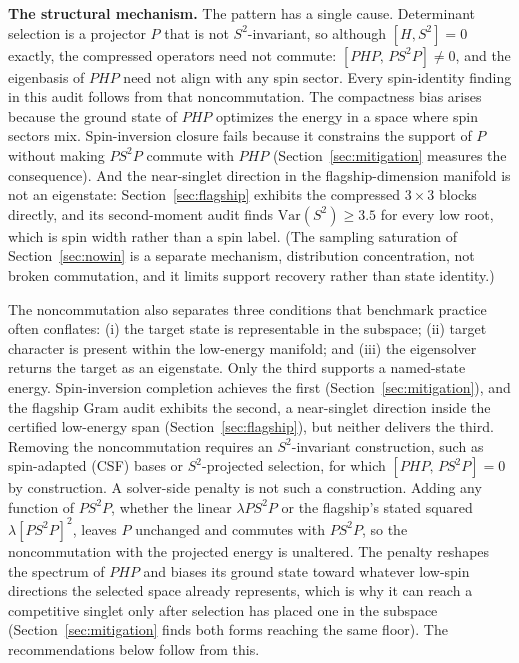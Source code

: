 \documentclass[11pt]{article}
\begin{document}
\textbf{The structural mechanism.} The pattern has a single cause. Determinant selection is a projector $P$ that is not $S^2$-invariant, so although $[H, S^2] = 0$ exactly, the compressed operators need not commute: $[PHP,\, PS^2P] \neq 0$, and the eigenbasis of $PHP$ need not align with any spin sector. Every spin-identity finding in this audit follows from that noncommutation. The compactness bias arises because the ground state of $PHP$ optimizes the energy in a space where spin sectors mix. Spin-inversion closure fails because it constrains the support of $P$ without making $PS^2P$ commute with $PHP$ (Section~\ref{sec:mitigation} measures the consequence). And the near-singlet direction in the flagship-dimension manifold is not an eigenstate: Section~\ref{sec:flagship} exhibits the compressed $3\times3$ blocks directly, and its second-moment audit finds $\mathrm{Var}(S^2) \ge 3.5$ for every low root, which is spin width rather than a spin label. (The sampling saturation of Section~\ref{sec:nowin} is a separate mechanism, distribution concentration, not broken commutation, and it limits support recovery rather than state identity.)

The noncommutation also separates three conditions that benchmark practice often conflates: (i) the target state is representable in the subspace; (ii) target character is present within the low-energy manifold; and (iii) the eigensolver returns the target as an eigenstate. Only the third supports a named-state energy. Spin-inversion completion achieves the first (Section~\ref{sec:mitigation}), and the flagship Gram audit exhibits the second, a near-singlet direction inside the certified low-energy span (Section~\ref{sec:flagship}), but neither delivers the third. Removing the noncommutation requires an $S^2$-invariant construction, such as spin-adapted (CSF) bases or $S^2$-projected selection, for which $[PHP,\, PS^2P] = 0$ by construction. A solver-side penalty is not such a construction. Adding any function of $PS^2P$, whether the linear $\lambda PS^2P$ or the flagship's stated squared $\lambda[PS^2P]^2$, leaves $P$ unchanged and commutes with $PS^2P$, so the noncommutation with the projected energy is unaltered. The penalty reshapes the spectrum of $PHP$ and biases its ground state toward whatever low-spin directions the selected space already represents, which is why it can reach a competitive singlet only after selection has placed one in the subspace (Section~\ref{sec:mitigation} finds both forms reaching the same floor). The recommendations below follow from this.
\end{document}
